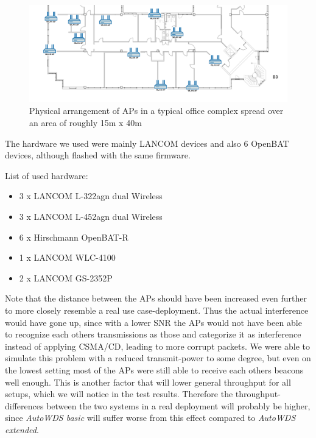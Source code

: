       \begin{figure}[h!]
	\centering
	\includegraphics[width=\columnwidth]{figures/Lancom-flur-withaps}
	\caption{Physical arrangement of APs in a typical office complex spread over an area of roughly 15m x 40m}
	\label{fig:2ndfloor}
      \end{figure}
      
      The hardware we used were mainly LANCOM devices and also 6 OpenBAT devices, although flashed with the same firmware.
     
      List of used hardware:
      \begin{itemize}
	\item 3 x LANCOM L-322agn dual Wireless \cite{lancom}
	\item 3 x LANCOM L-452agn dual Wireless
	\item 6 x Hirschmann OpenBAT-R
	\item 1 x LANCOM WLC-4100
	\item 2 x LANCOM GS-2352P
      \end{itemize}
      
      Note that the distance between the APs should have been increased even further to more closely resemble a real use case-deployment.
      Thus the actual interference would have gone up, since with a lower \ac{SNR} the APs would not have been able to recognize each others 
      transmissions as those and categorize it as interference instead of applying CSMA/CD, leading to more corrupt packets.
      We were able to simulate this problem with a reduced transmit-power to some degree,
      but even on the lowest setting most of the APs were still able to receive each others beacons well enough. 
      This is another factor that will lower general throughput for all setups, which we will notice in the test results.
      Therefore the throughput-differences between the two systems in a real deployment will probably be higher,
      since \textit{AutoWDS basic} will suffer worse from this effect compared to \textit{AutoWDS extended}.
    
